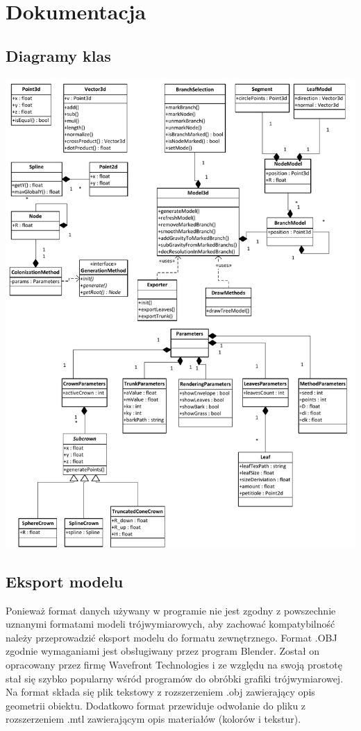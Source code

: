 \chapter{Dokumentacja}

\section{Diagramy klas}

\begin{center}
	\includegraphics[scale=0.55]{images/treemaker_uml}
	\label{treemaker_uml}
\end{center}

\section{Eksport modelu}
Ponieważ format danych używany w programie nie jest zgodny z powszechnie uznanymi formatami modeli trójwymiarowych, aby zachować kompatybilność należy przeprowadzić eksport modelu do 
formatu zewnętrznego. Format .OBJ zgodnie wymaganiami jest obsługiwany przez program Blender.
Został on opracowany przez firmę Wavefront Technologies i ze względu na swoją prostotę stał się szybko
popularny wśród programów do obróbki grafiki trójwymiarowej. Na format składa się plik tekstowy z rozszerzeniem .obj 
zawierający opis geometrii obiektu. Dodatkowo format przewiduje odwołanie do pliku z rozszerzeniem .mtl zawierającym
opis materiałów (kolorów i tekstur).



